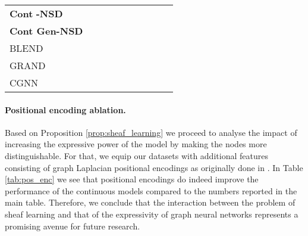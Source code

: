 \documentclass{article}
\begin{document}
\begin{table*}[t]
{\begin{tabular}{l ccccccccc}
         \textbf{Cont} \textbf{-NSD} &
          &
          &
          & 
          & 
          &
          & 
          &
          &
         \\
         
         \textbf{Cont Gen-NSD} &
          &
          &
          & 
          & 
          &
          & 
          &
          &
          \\  
         
         \midrule
         
        BLEND &
           &
           &
           & 
           & 
           &
          & 
          &
          &
          \\ 
         
         GRAND &
           &
           &
           & 
           & 
           &
           & 
          &
          &
         \\
        
         CGNN &
           &
           &
           & 
           & 
           &
           & 
           &
           &
          \\
         
         \bottomrule
         
    \end{tabular}
    }
    \label{tab:cont_table}
\end{table*} 

\paragraph{Positional encoding ablation.} Based on Proposition \ref{prop:sheaf_learning} we proceed to analyse the impact of increasing the expressive power of the model by making the nodes more distinguishable. For that, we equip our datasets with additional features consisting of graph Laplacian positional encodings as originally done in \citet{dwivedi2020benchmarkgnns}. In Table \ref{tab:pos_enc} we see that positional encodings do indeed improve the performance of the continuous models compared to the numbers reported in the main table. Therefore, we conclude that the interaction between the problem of sheaf learning and that of the expressivity of graph neural networks represents a promising avenue for future research. 
\end{document}
